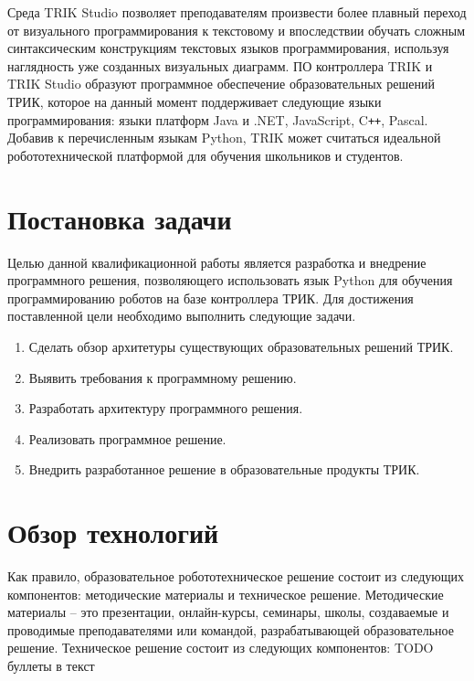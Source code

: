 \documentclass[14pt]{matmex-diploma-custom}
\begin{document}
Среда TRIK Studio позволяет преподавателям произвести более плавный переход от визуального программирования к текстовому и впоследствии обучать сложным синтаксическим конструкциям текстовых языков программирования, используя наглядность уже созданных визуальных диаграмм. ПО контроллера TRIK и TRIK Studio образуют программное обеспечение образовательных решений ТРИК, которое на данный момент поддерживает следующие языки программирования: языки платформ Java и .NET, JavaScript, C\texttt{++}, Pascal. Добавив к перечисленным языкам Python, TRIK может считаться идеальной робототехнической платформой для обучения школьников и студентов.


\section*{Постановка задачи}

Целью данной квалификационной работы является разработка и внедрение программного решения, позволяющего использовать язык Python для обучения программированию роботов на базе контроллера ТРИК. Для достижения поставленной цели необходимо выполнить следующие задачи.

\begin{enumerate}
\item Сделать обзор архитетуры существующих образовательных решений ТРИК.
\item Выявить требования к программному решению.
\item Разработать архитектуру программного решения.
\item Реализовать программное решение.
\item Внедрить разработанное решение в образовательные продукты ТРИК.
\end{enumerate}

\section{Обзор технологий}

Как правило, образовательное робототехническое решение состоит из следующих компонентов: методические материалы и техническое решение. Методические материалы -- это презентации, онлайн-курсы, семинары, школы, создаваемые и проводимые преподавателями или командой, разрабатывающей образовательное решение. Техническое решение состоит из следующих компонентов:   TODO буллеты в текст
\end{document}
